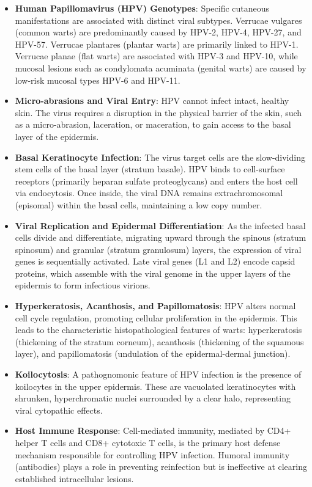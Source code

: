 \begin{itemize}
    \item \textbf{Human Papillomavirus (HPV) Genotypes}: Specific cutaneous manifestations are associated with distinct viral subtypes. Verrucae vulgares (common warts) are predominantly caused by HPV-2, HPV-4, HPV-27, and HPV-57. Verrucae plantares (plantar warts) are primarily linked to HPV-1. Verrucae planae (flat warts) are associated with HPV-3 and HPV-10, while mucosal lesions such as condylomata acuminata (genital warts) are caused by low-risk mucosal types HPV-6 and HPV-11.
    \item \textbf{Micro-abrasions and Viral Entry}: HPV cannot infect intact, healthy skin. The virus requires a disruption in the physical barrier of the skin, such as a micro-abrasion, laceration, or maceration, to gain access to the basal layer of the epidermis.
    \item \textbf{Basal Keratinocyte Infection}: The virus target cells are the slow-dividing stem cells of the basal layer (stratum basale). HPV binds to cell-surface receptors (primarily heparan sulfate proteoglycans) and enters the host cell via endocytosis. Once inside, the viral DNA remains extrachromosomal (episomal) within the basal cells, maintaining a low copy number.
    \item \textbf{Viral Replication and Epidermal Differentiation}: As the infected basal cells divide and differentiate, migrating upward through the spinous (stratum spinosum) and granular (stratum granulosum) layers, the expression of viral genes is sequentially activated. Late viral genes (L1 and L2) encode capsid proteins, which assemble with the viral genome in the upper layers of the epidermis to form infectious virions.
    \item \textbf{Hyperkeratosis, Acanthosis, and Papillomatosis}: HPV alters normal cell cycle regulation, promoting cellular proliferation in the epidermis. This leads to the characteristic histopathological features of warts: hyperkeratosis (thickening of the stratum corneum), acanthosis (thickening of the squamous layer), and papillomatosis (undulation of the epidermal-dermal junction).
    \item \textbf{Koilocytosis}: A pathognomonic feature of HPV infection is the presence of koilocytes in the upper epidermis. These are vacuolated keratinocytes with shrunken, hyperchromatic nuclei surrounded by a clear halo, representing viral cytopathic effects.
    \item \textbf{Host Immune Response}: Cell-mediated immunity, mediated by CD4+ helper T cells and CD8+ cytotoxic T cells, is the primary host defense mechanism responsible for controlling HPV infection. Humoral immunity (antibodies) plays a role in preventing reinfection but is ineffective at clearing established intracellular lesions.
\end{itemize}

